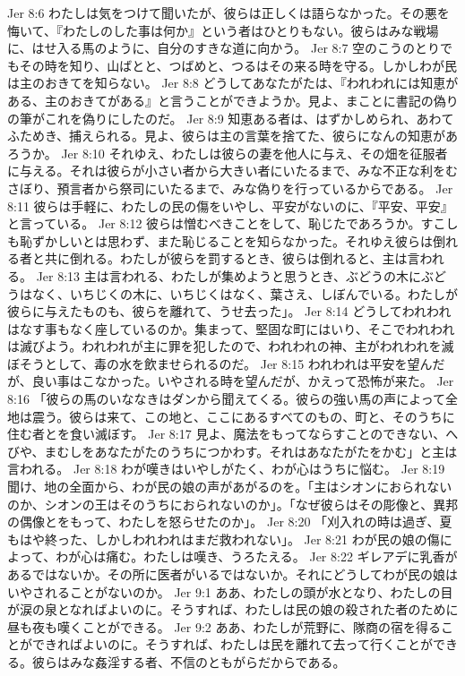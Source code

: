 Jer 8:6  わたしは気をつけて聞いたが、彼らは正しくは語らなかった。その悪を悔いて、『わたしのした事は何か』という者はひとりもない。彼らはみな戦場に、はせ入る馬のように、自分のすきな道に向かう。
Jer 8:7  空のこうのとりでもその時を知り、山ばとと、つばめと、つるはその来る時を守る。しかしわが民は主のおきてを知らない。
Jer 8:8  どうしてあなたがたは、『われわれには知恵がある、主のおきてがある』と言うことができようか。見よ、まことに書記の偽りの筆がこれを偽りにしたのだ。
Jer 8:9  知恵ある者は、はずかしめられ、あわてふためき、捕えられる。見よ、彼らは主の言葉を捨てた、彼らになんの知恵があろうか。
Jer 8:10  それゆえ、わたしは彼らの妻を他人に与え、その畑を征服者に与える。それは彼らが小さい者から大きい者にいたるまで、みな不正な利をむさぼり、預言者から祭司にいたるまで、みな偽りを行っているからである。
Jer 8:11  彼らは手軽に、わたしの民の傷をいやし、平安がないのに、『平安、平安』と言っている。
Jer 8:12  彼らは憎むべきことをして、恥じたであろうか。すこしも恥ずかしいとは思わず、また恥じることを知らなかった。それゆえ彼らは倒れる者と共に倒れる。わたしが彼らを罰するとき、彼らは倒れると、主は言われる。
Jer 8:13  主は言われる、わたしが集めようと思うとき、ぶどうの木にぶどうはなく、いちじくの木に、いちじくはなく、葉さえ、しぼんでいる。わたしが彼らに与えたものも、彼らを離れて、うせ去った」。
Jer 8:14  どうしてわれわれはなす事もなく座しているのか。集まって、堅固な町にはいり、そこでわれわれは滅びよう。われわれが主に罪を犯したので、われわれの神、主がわれわれを滅ぼそうとして、毒の水を飲ませられるのだ。
Jer 8:15  われわれは平安を望んだが、良い事はこなかった。いやされる時を望んだが、かえって恐怖が来た。
Jer 8:16  「彼らの馬のいななきはダンから聞えてくる。彼らの強い馬の声によって全地は震う。彼らは来て、この地と、ここにあるすべてのもの、町と、そのうちに住む者とを食い滅ぼす。
Jer 8:17  見よ、魔法をもってならすことのできない、へびや、まむしをあなたがたのうちにつかわす。それはあなたがたをかむ」と主は言われる。
Jer 8:18  わが嘆きはいやしがたく、わが心はうちに悩む。
Jer 8:19  聞け、地の全面から、わが民の娘の声があがるのを。「主はシオンにおられないのか、シオンの王はそのうちにおられないのか」。「なぜ彼らはその彫像と、異邦の偶像とをもって、わたしを怒らせたのか」。
Jer 8:20  「刈入れの時は過ぎ、夏もはや終った、しかしわれわれはまだ救われない」。
Jer 8:21  わが民の娘の傷によって、わが心は痛む。わたしは嘆き、うろたえる。
Jer 8:22  ギレアデに乳香があるではないか。その所に医者がいるではないか。それにどうしてわが民の娘はいやされることがないのか。
Jer 9:1  ああ、わたしの頭が水となり、わたしの目が涙の泉となればよいのに。そうすれば、わたしは民の娘の殺された者のために昼も夜も嘆くことができる。
Jer 9:2  ああ、わたしが荒野に、隊商の宿を得ることができればよいのに。そうすれば、わたしは民を離れて去って行くことができる。彼らはみな姦淫する者、不信のともがらだからである。
